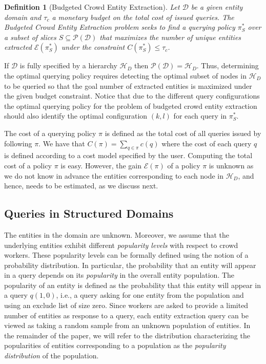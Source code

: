 \documentclass{vldb}
\newtheorem{definition}{Definition}
\newcommand{\domain}{\mathcal{D}}
\newcommand{\hierarchy}{\mathcal{H}_D}
\newcommand{\uentities}{\mathcal{E}}
\begin{document}
\begin{definition}[Budgeted Crowd Entity Extraction]
Let $\domain$ be a given entity domain and $\tau_c$ a monetary budget on the total cost of issued queries. The Budgeted Crowd Entity Extraction problem seeks to find 
a querying policy $\pi^*_S$ over a subset of slices $S \subseteq \mathcal{P}(\domain)$ that maximizes the number of unique entities extracted $\uentities(\pi^*_S)$ under the constraint $C(\pi^*_S) \leq \tau_c$.
\end{definition}

If $\domain$ is fully specified by a hierarchy $\hierarchy$ then $\mathcal{P}(\domain) = \hierarchy$. Thus, determining the optimal querying policy requires detecting the optimal subset of nodes in $\hierarchy$ to be queried so that the goal number of extracted entities is maximized under the given budget constraint. Notice that due to the different query configurations the optimal querying policy for the problem of budgeted crowd entity extraction should also identify the optimal configuration $(k,l)$ for each query in $\pi^*_S$.

The cost of a querying policy $\pi$ is defined as the total cost of all queries issued by following $\pi$. We have that $C(\pi) = \sum_{q \in \pi} c(q)$ where the cost of each query $q$ is defined according to a cost model specified by the user. Computing the total cost of a policy $\pi$ is easy. However, the gain $\uentities(\pi)$ of a policy $\pi$ is unknown as we do not know in advance the entities corresponding to each node in $\hierarchy$, and hence, needs to be estimated, as we discuss next. 

\subsection{Queries in Structured Domains}
\label{sec:sampling}
The entities in the domain are unknown. Moreover, we assume that the underlying entities exhibit different {\em popularity levels} with respect to crowd workers. These popularity levels can be formally defined using the notion of a probability distribution. In particular, the probability that an entity will appear in a query depends on its {\em popularity} in the overall entity population. The popularity of an entity is defined as the probability that this entity will appear in a query $q(1,0)$, i.e., a query asking for one entity from the population and using an exclude list of size zero. Since workers are asked to provide a limited number of entities as response to a query, each entity extraction query can be viewed as taking a random sample from an unknown population of entities. In the remainder of the paper, we will refer to the distribution characterizing the popularities of entities corresponding to a population as the {\em popularity distribution} of the population. 
\end{document}
